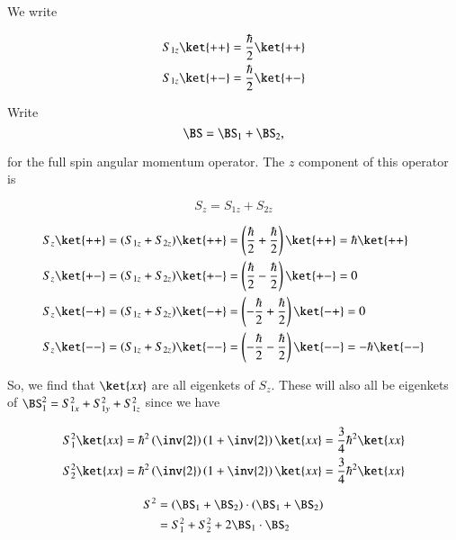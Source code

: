 We write

\begin{align}\label{eqn:qmTwoL16:250}
S_{1z}\ket{++} &= \frac{\hbar}{2} \ket{++} \\
S_{1z}\ket{+-} &= \frac{\hbar}{2} \ket{+-}
\end{align}

Write
\begin{equation}\label{eqn:qmTwoL16:270}
\BS = \BS_1 + \BS_2,
\end{equation}

for the full spin angular momentum operator.  The $z$ component of this operator is 

\begin{equation}\label{eqn:qmTwoL16:290}
S_z = S_{1z} + S_{2z}
\end{equation}

\begin{align}\label{eqn:qmTwoL16:310}
S_z\ket{++} &= (S_{1z} + S_{2z}) \ket{++} = \left( \frac{\hbar}{2} +\frac{\hbar}{2} \right) \ket{++} = \hbar \ket{++} \\ 
S_z\ket{+-} &= (S_{1z} + S_{2z}) \ket{+-} = \left( \frac{\hbar}{2} -\frac{\hbar}{2} \right) \ket{+-} = 0 \\
S_z\ket{-+} &= (S_{1z} + S_{2z}) \ket{-+} = \left( -\frac{\hbar}{2} +\frac{\hbar}{2} \right) \ket{-+} = 0 \\
S_z\ket{--} &= (S_{1z} + S_{2z}) \ket{--} = \left( -\frac{\hbar}{2} -\frac{\hbar}{2} \right) \ket{--} = -\hbar \ket{--} 
\end{align}

So, we find that $\ket{x x}$ are all eigenkets of $S_z$.  These will also all be eigenkets of $\BS_1^2 = S_{1x}^2 +S_{1y}^2 +S_{1z}^2$ since we have

\begin{align}\label{eqn:qmTwoL16:330}
S_1^2 \ket{x x} &= \hbar^2 \left(\inv{2}\right) \left(1 + \inv{2}\right) \ket{x x} = \frac{3}{4} \hbar^2 \ket{x x} \\
S_2^2 \ket{x x} &= \hbar^2 \left(\inv{2}\right) \left(1 + \inv{2}\right) \ket{x x} = \frac{3}{4} \hbar^2 \ket{x x} 
\end{align}

\begin{equation}\label{eqn:qmTwoL16:350}
\begin{aligned}
S^2 &= 
(\BS_1
+\BS_2) 
\cdot
(\BS_1
+\BS_2)  \\
&= 
S_1^2 + S_2^2 + 2 \BS_1 \cdot \BS_2
\end{aligned}
\end{equation}

